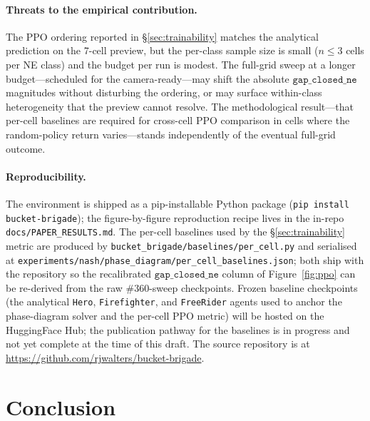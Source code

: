\documentclass{anvil-paper}
\begin{document}
\paragraph{Threats to the empirical contribution.}
The PPO ordering reported in \S\ref{sec:trainability} matches the
analytical prediction on the 7-cell preview, but the per-class
sample size is small ($n\leq 3$ cells per NE class) and the budget per
run is modest. The full-grid sweep at a longer budget---scheduled for the
camera-ready---may shift the absolute $\texttt{gap\_closed\_ne}$ magnitudes
without disturbing the ordering, or may surface within-class
heterogeneity that the preview cannot resolve. The methodological
result---that per-cell baselines are required for cross-cell PPO comparison
in cells where the random-policy return varies---stands independently of
the eventual full-grid outcome.

\paragraph{Reproducibility.}
The environment is shipped as a pip-installable Python package
(\texttt{pip install bucket-brigade}); the figure-by-figure reproduction
recipe lives in the in-repo \texttt{docs/PAPER\_RESULTS.md}. The per-cell
baselines used by the \S\ref{sec:trainability} metric are produced by
\texttt{bucket\_brigade/baselines/per\_cell.py} and serialised at
\texttt{experiments/nash/phase\_diagram/per\_cell\_baselines.json}; both
ship with the repository so the recalibrated $\texttt{gap\_closed\_ne}$
column of Figure~\ref{fig:ppo} can be re-derived from the raw
\#360-sweep checkpoints.
Frozen baseline checkpoints (the analytical \texttt{Hero},
\texttt{Firefighter}, and \texttt{FreeRider} agents used to anchor the
phase-diagram solver and the per-cell PPO metric) will be hosted on the
HuggingFace Hub; the publication pathway for the baselines is in progress
and not yet complete at the time of this draft. The source repository is at
\url{https://github.com/rjwalters/bucket-brigade}.

\section*{Conclusion}
\end{document}
